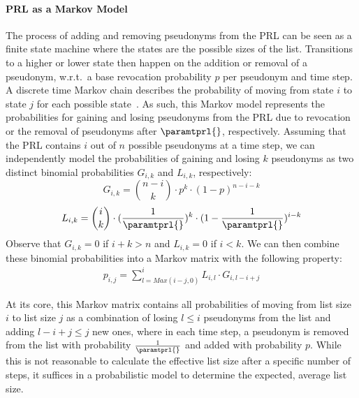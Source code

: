 \paragraph{PRL as a Markov Model}
%
The process of adding and removing pseudonyms from the \ac{PRL} can be seen as a
finite state machine where the states are the possible sizes of the list.
Transitions to a higher or lower state then happen on the addition or removal of
a pseudonym, w.r.t.~a base revocation probability $p$ per pseudonym and time step.  
A discrete time Markov chain describes the probability of moving
from state $i$ to state $j$ for each possible state~\cite{hermanns2002markov}.
As such, this Markov model represents the probabilities for gaining and losing
pseudonyms from the PRL due to revocation or the removal of pseudonyms after
$\paramtprl{}$, respectively. Assuming that the PRL contains $i$ out of $n$
possible pseudonyms at a time step, we can independently model the probabilities
of gaining and losing $k$ pseudonyms as two distinct binomial probabilities
$G_{i,k}$ and $L_{i,k}$, respectively: %
\begin{equation}
    \label{eq:prl-size-g}
    G_{i,k} = \binom{n-i}{k} \cdot p^k \cdot (1-p)^{n-i-k}  
\end{equation}
\begin{equation}
    \label{eq:prl-size-l}
    L_{i,k} = \binom{i}{k} \cdot (\frac{1}{\paramtprl{}})^{k} \cdot (1-\frac{1}{\paramtprl{}})^{i-k} 
\end{equation}
Observe that $G_{i,k}=0$ if $i+k>n$ and $L_{i,k}=0$ if $i<k$.  We can then
combine these binomial probabilities into a Markov matrix with the following
property:
\begin{align}
    \label{eq:prl-size-markov}
    p_{i,j} = \sum_{l=Max(i-j, 0)}^{i} L_{i,l} \cdot G_{i,l-i+j}
\end{align}

At its core, this Markov matrix contains all probabilities of moving from list
size $i$ to list size $j$ as a combination of losing $l\leq i$ pseudonyms from
the list and adding $l-i+j\leq j$ new ones,   
where in each time step, a pseudonym is removed from the list with probability
$\frac{1}{\paramtprl{}}$ and added with probability $p$.  While this is not
reasonable to calculate the effective list size after a specific number of
steps, it suffices in a probabilistic model to determine the expected, average
list size.

